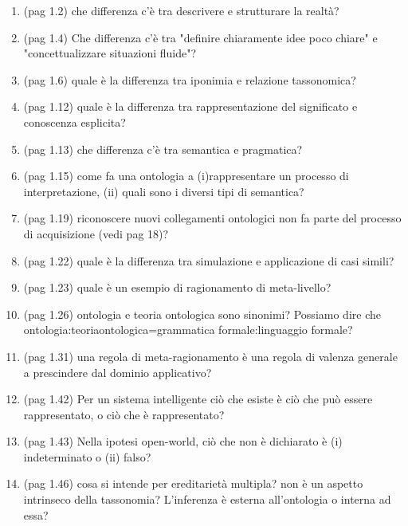 \begin{enumerate}
	
	\item (pag 1.2) che differenza c'è tra descrivere e strutturare la realtà?

	\item (pag 1.4) Che differenza c'è tra "definire chiaramente idee poco chiare" e "concettualizzare situazioni fluide"?
	
	\item (pag 1.6) quale è la differenza tra iponimia e relazione tassonomica?
	
	\item (pag 1.12) quale è la differenza tra rappresentazione del significato e conoscenza esplicita?
	
	\item (pag 1.13) che differenza c'è tra semantica e pragmatica?
	
	\item (pag 1.15) come fa una ontologia a (i)rappresentare un processo di interpretazione, (ii) quali sono i diversi tipi di semantica?
	
	\item (pag 1.19) riconoscere nuovi collegamenti ontologici non fa parte del processo di acquisizione (vedi pag 18)? 
	
	\item (pag 1.22) quale è la differenza tra simulazione e applicazione di casi simili?
	
	\item (pag 1.23) quale è un esempio di ragionamento di meta-livello?
	
	\item (pag 1.26) ontologia e teoria ontologica sono sinonimi? Possiamo dire che ontologia:teoriaontologica=grammatica formale:linguaggio formale?
	
	\item (pag 1.31) una regola di meta-ragionamento è una regola di valenza generale a prescindere dal dominio applicativo?
	
	\item (pag 1.42) Per un sistema intelligente ciò che esiste è ciò che può essere rappresentato, o ciò che è rappresentato?
	
	\item (pag 1.43) Nella ipotesi open-world, ciò che non è dichiarato è (i) indeterminato o (ii) falso?
	
	\item (pag 1.46) cosa si intende per ereditarietà multipla? non è un aspetto intrinseco della tassonomia? L'inferenza è esterna all'ontologia o interna ad essa?
	

\end{enumerate}
